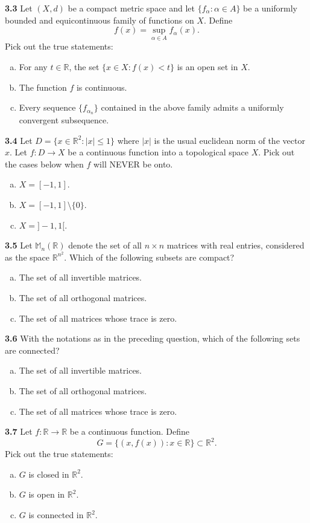 \documentclass[11pt,a4paper]{article}
\newcommand{\R}{\mathbb{R}}
\newcommand{\M}{\mathbb{M}}
\newcommand{\qitem}[1]{\par\medskip\noindent\textbf{#1}\hspace{0.5em}}
\begin{document}
\qitem{3.3} Let $(X, d)$ be a compact metric space and let $\{f_\alpha : \alpha \in A\}$ be a uniformly bounded and equicontinuous family of functions on $X$. Define
\[
  f(x) = \sup_{\alpha \in A} f_\alpha(x).
\]
Pick out the true statements:
\begin{enumerate}[(a)]
  \item For any $t \in \R$, the set $\{x \in X : f(x) < t\}$ is an open set in $X$.
  \item The function $f$ is continuous.
  \item Every sequence $\{f_{\alpha_n}\}$ contained in the above family admits a uniformly convergent subsequence.
\end{enumerate}

\qitem{3.4} Let $D = \{x \in \R^2 : |x| \le 1\}$ where $|x|$ is the usual euclidean norm of the vector $x$. Let $f : D \to X$ be a continuous function into a topological space $X$. Pick out the cases below when $f$ will NEVER be onto.
\begin{enumerate}[(a)]
  \item $X = [-1, 1]$.
  \item $X = [-1, 1] \setminus \{0\}$.
  \item $X = ]-1, 1[$.
\end{enumerate}

\qitem{3.5} Let $\M_n(\R)$ denote the set of all $n \times n$ matrices with real entries, considered as the space $\R^{n^2}$. Which of the following subsets are compact?
\begin{enumerate}[(a)]
  \item The set of all invertible matrices.
  \item The set of all orthogonal matrices.
  \item The set of all matrices whose trace is zero.
\end{enumerate}

\qitem{3.6} With the notations as in the preceding question, which of the following sets are connected?
\begin{enumerate}[(a)]
  \item The set of all invertible matrices.
  \item The set of all orthogonal matrices.
  \item The set of all matrices whose trace is zero.
\end{enumerate}

\qitem{3.7} Let $f : \R \to \R$ be a continuous function. Define
\[
  G = \{(x, f(x)) : x \in \R\} \subset \R^2.
\]
Pick out the true statements:
\begin{enumerate}[(a)]
  \item $G$ is closed in $\R^2$.
  \item $G$ is open in $\R^2$.
  \item $G$ is connected in $\R^2$.
\end{enumerate}
\end{document}
